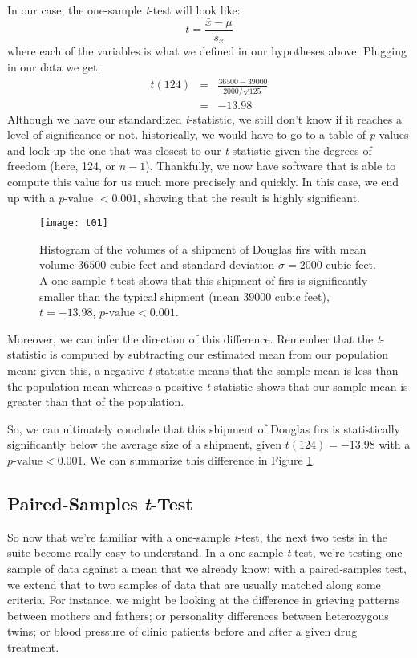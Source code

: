 In our case, the one-sample \textit{t}-test will look like:
\begin{equation}
t=\frac{\bar{x}-\mu}{s_x}
\end{equation}
where each of the variables is what we defined in our hypotheses above. Plugging in our data we get:
\begin{eqnarray*}
t(124)&=&\frac{36500-39000}{2000/\sqrt{125}} \\
&=& -13.98
\end{eqnarray*}
Although we have our standardized \textit{t}-statistic, we still don't know if it reaches a level of significance or not. historically, we would have to go to a table of \textit{p}-values and look up the one that was closest to our \textit{t}-statistic given the degrees of freedom (here, 124, or $n-1$). Thankfully, we now have software that is able to compute this value for us much more precisely and quickly. In this case, we end up with a \textit{p}-value $< 0.001$, showing that the result is highly significant.

\begin{figure}[h]
\texttt{[image: t01]}
\label{fig:t01}
\caption{Histogram of the volumes of a shipment of Douglas firs with mean volume $36500$ cubic feet and standard deviation $\sigma = 2000$ cubic feet. A one-sample \textit{t}-test shows that this shipment of firs is significantly smaller than the typical shipment (mean $39000$ cubic feet), $t=-13.98$, $p\text{-value}<0.001$.}
\end{figure}

Moreover, we can infer the direction of this difference. Remember that the \textit{t}-statistic is computed by subtracting our estimated mean from our population mean: given this, a negative \textit{t}-statistic means that the sample mean is less than the population mean whereas a positive \textit{t}-statistic shows that our sample mean is greater than that of the population.

So, we can ultimately conclude that this shipment of Douglas firs is statistically significantly below the average size of a shipment, given $t(124)=-13.98$ with a $p\text{-value} < 0.001$. We can summarize this difference in Figure \ref{fig:t01}.

\subsection{Paired-Samples \textit{t}-Test}

So now that we're familiar with a one-sample \textit{t}-test, the next two tests in the suite become really easy to understand. In a one-sample \textit{t}-test, we're testing one sample of data against a mean that we already know; with a paired-samples test, we extend that to two samples of data that are usually matched along some criteria. For instance, we might be looking at the difference in grieving patterns between mothers and fathers; or personality differences between heterozygous twins; or blood pressure of clinic patients before and after a given drug treatment.

